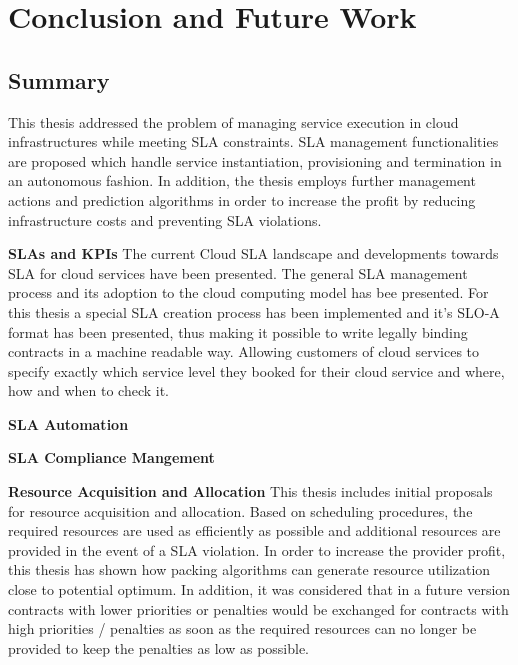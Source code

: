 
\chapter{Conclusion and Future Work} %

\label{Conclusion} %


\section{Summary}
This thesis addressed the problem of managing service execution in cloud infrastructures while meeting SLA constraints. SLA management functionalities are proposed which handle service instantiation, provisioning and termination in an autonomous fashion. In addition, the thesis employs further management actions and prediction algorithms in order to increase the profit by reducing infrastructure costs and preventing SLA violations.

\textbf{SLAs and KPIs} The current Cloud SLA landscape and developments towards SLA for cloud services have been presented. The general SLA management process and its adoption to the cloud computing model has bee presented. For this thesis a special SLA creation process has been implemented and it's SLO-A format has been presented, thus making it possible to write legally binding contracts in a machine readable way. Allowing customers of cloud services to specify exactly which service level they booked for their cloud service and where, how and when to check it.

\textbf{SLA Automation}

\textbf{SLA Compliance Mangement}

\textbf{Resource Acquisition and Allocation} 
This thesis includes initial proposals for resource acquisition and allocation. Based on scheduling procedures, the required resources are used as efficiently as possible and additional resources are provided in the event of a SLA violation. In order to increase the provider profit, this thesis has shown how packing algorithms can generate resource utilization close to potential optimum. In addition, it was considered that in a future version contracts with lower priorities or penalties would be exchanged for contracts with high priorities / penalties as soon as the required resources can no longer be provided to keep the penalties as low as possible.



